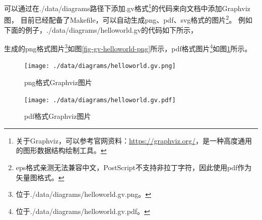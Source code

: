 可以通过在./data/diagrams路径下添加.gv格式\footnote{关于Graphviz，可以参考官网资料：\url{https://graphviz.org/}，是一种高度通用的图形数据结构绘制工具。}的代码来向文档中添加Graphviz图，
目前已经配备了Makefile，可以自动生成png、pdf、svg格式的图片\footnote{eps格式亲测无法兼容中文，PostScript不支持非拉丁字符，因此使用pdf作为矢量图格式。}。
例如下面的例子，./data/diagrams/helloworld.gv的代码如下所示，

生成的png格式图片\footnote{位于./data/diagrams/helloworld.gv.png。}如图\ref{fig-gv-helloworld-png}所示，pdf格式图片\footnote{位于./data/diagrams/helloworld.gv.pdf。}如图\ref{fig-gv-helloworld-pdf}所示。
\begin{figure}[h!]
	\begin{minipage}{0.48\textwidth}
		\centering
		\texttt{[image: ./data/diagrams/helloworld.gv.png]}
		\caption{png格式Graphviz图片}
		\label{fig-gv-helloworld-png}
	\end{minipage}
	\begin{minipage}{0.48\textwidth}
		\centering
		\texttt{[image: ./data/diagrams/helloworld.gv.pdf]}
		\caption{pdf格式Graphviz图片}
		\label{fig-gv-helloworld-pdf}
	\end{minipage}
\end{figure}
